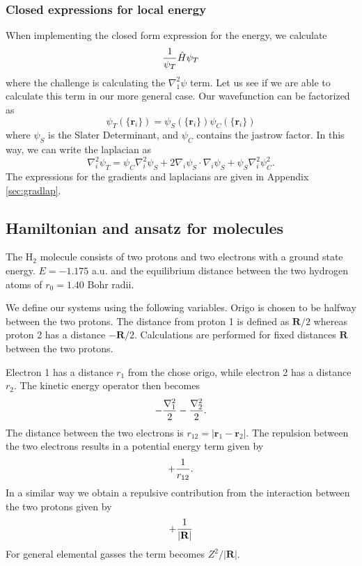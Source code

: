 \documentclass[aps,prc,twocolumn,floatfix]{revtex4}
\def\rvec{\textbf{r}}
\def\Rvec{\textbf{R}}
\begin{document}
\subsubsection{Closed expressions for local energy}
When implementing the closed form expression for the energy, we calculate
\begin{equation}
 {1 \over \psi_T} \hat{H} \psi_T
\end{equation}
where the challenge is calculating the $\nabla^2_1\psi$ term. Let us see if we are able to calculate this term in our more general case. Our wavefunction can be factorized as 
\begin{equation}
 \psi_T(\{ \rvec_i \}) = \psi_S(\{ \rvec_i \})\psi_C(\{\rvec_i \})
\end{equation}
where $\psi_S$ is the Slater Determinant, and $\psi_C$ contains the jastrow factor. In this way, we can write the laplacian as 
\begin{equation}
 \nabla_i^2 \psi_T = \psi_C \nabla_i^2 \psi_S + 2 \nabla_i \psi_S \cdot \nabla_i \psi_S + \psi_S \nabla_i^2 \psi_C^2.
\end{equation}
The expressions for the gradients and laplacians are given in Appendix \ref{sec:gradlap}.

\subsection{Hamiltonian and ansatz for molecules}
The $\text{H}_2$ molecule consists of two protons and two electrons with a ground state energy.
$E = -1.175$ a.u. and the equilibrium distance between the two
hydrogen atoms of $r_0 = 1.40$ Bohr radii.

We define our systems using the following variables. Origo is chosen to be halfway
between the two protons. The distance from proton 1 is defined as $\Rvec/2$ whereas
proton 2 has a distance $-\Rvec/2$. Calculations are performed for fixed distances $\Rvec$ between the two protons.

Electron 1 has a distance $r_1$ from the chose origo, while electron 2 has a distance $r_2$. The kinetic energy operator then becomes 
\begin{equation}
 -{\nabla^2_1 \over 2} - {\nabla^2_2 \over 2}.
\end{equation}
The distance between the two electrons is $r_{12} = |\rvec_1 - \rvec_2|$. The repulsion between the two electrons results in a potential energy term given by 
\begin{equation}
 +{1\over r_{12}}.
\end{equation}
In a similar way we obtain a repulsive contribution from the interaction between the two protons given by 
\begin{equation}
 + {1\over |\Rvec|}
\end{equation}
For general elemental gasses the term becomes ${Z^2/ |\Rvec|}$. 
\end{document}
